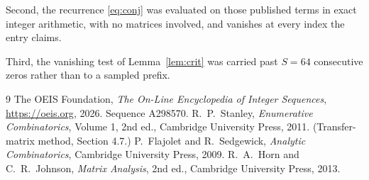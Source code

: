 \documentclass[11pt,a4paper]{article}
\theoremstyle{plain}
\theoremstyle{definition}
\begin{document}
Second, the recurrence \eqref{eq:conj} was evaluated on those published terms in exact
integer arithmetic, with no matrices involved, and vanishes at every index the entry claims.

Third, the vanishing test of Lemma~\ref{lem:crit} was carried past $S=64$ consecutive
zeros rather than to a sampled prefix.

\begin{thebibliography}{9}
 The OEIS Foundation, \emph{The On-Line Encyclopedia of Integer
Sequences}, \url{https://oeis.org}, 2026. Sequence A298570.
 R.~P.~Stanley, \emph{Enumerative Combinatorics}, Volume 1, 2nd ed.,
Cambridge University Press, 2011. (Transfer-matrix method, Section 4.7.)
 P.~Flajolet and R.~Sedgewick, \emph{Analytic Combinatorics}, Cambridge
University Press, 2009.
 R.~A.~Horn and C.~R.~Johnson, \emph{Matrix Analysis}, 2nd ed., Cambridge
University Press, 2013.
\end{thebibliography}
\end{document}
